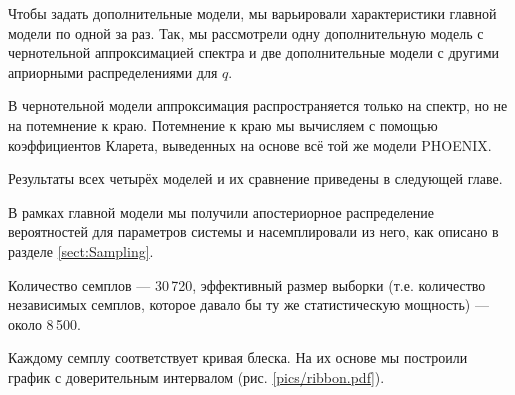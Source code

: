 Чтобы задать дополнительные модели, мы варьировали характеристики главной модели по одной за раз.
Так, мы рассмотрели одну дополнительную модель с чернотельной аппроксимацией спектра и две дополнительные модели с другими априорными распределениями для $q$.

В чернотельной модели аппроксимация распространяется только на спектр, но не на потемнение к краю. Потемнение к краю мы вычисляем с помощью коэффициентов Кларета, выведенных на основе всё той же модели PHOENIX.



Результаты всех четырёх моделей и их сравнение приведены в следующей главе.

















В рамках главной модели мы получили апостериорное распределение вероятностей для параметров системы и насемплировали из него, как описано в разделе \ref{sect:Sampling}.

Количество семплов --- 30\,720, эффективный размер выборки (т.е. количество независимых семплов, которое давало бы ту же статистическую мощность) --- около 8\,500.

Каждому семплу соответствует кривая блеска. На их основе мы построили график с доверительным интервалом (рис. \ref{pics/ribbon.pdf}).

